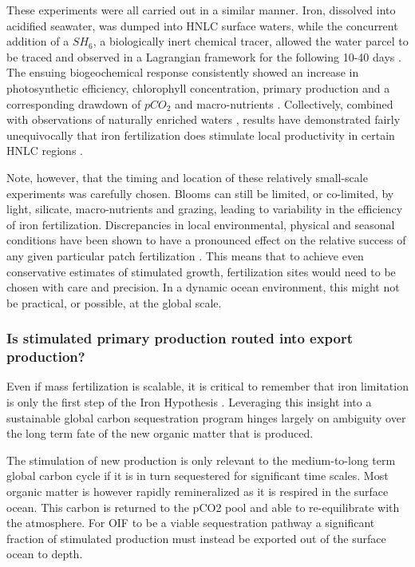 These experiments were all carried out in a similar manner. Iron, dissolved into acidified seawater, was dumped into HNLC surface waters, while the concurrent addition of a $SH_6$, a biologically inert chemical tracer, allowed the water parcel to be traced and observed in a Lagrangian framework for the following 10-40 days \parencite{BoydMesoscaleIronEnrichment2007}. The ensuing biogeochemical response consistently showed an increase in photosynthetic efficiency, chlorophyll concentration, primary production and a corresponding drawdown of $pCO_2$ and macro-nutrients \parencite{YoonOceanIronFertilization2016}. Collectively, combined with observations of naturally enriched waters \parencite{deBaarSynthesisironfertilization2005}, results have demonstrated fairly unequivocally that iron fertilization does stimulate local productivity in certain HNLC regions \parencite{YoonOceanIronFertilization2016, BoydMesoscaleIronEnrichment2007}. 

Note, however, that the timing and location of these relatively small-scale experiments was carefully chosen. Blooms can still be limited, or co-limited, by light, silicate, macro-nutrients and grazing, leading to variability in the efficiency of iron fertilization. Discrepancies in local environmental, physical and seasonal conditions have been shown to have a pronounced effect on the relative success of any given particular patch fertilization \parencite{BoydMesoscaleIronEnrichment2007}. This means that to achieve even conservative estimates of stimulated growth, fertilization sites would need to be chosen with care and precision. In a dynamic ocean environment, this might not be practical, or possible, at the global scale. 

\subsubsection{Is stimulated primary production routed into export production?}

Even if mass fertilization is scalable, it is critical to remember that iron limitation is only the first step of the Iron Hypothesis \parencite{BuesselerOceanIronFertilization2008}. Leveraging this insight into a sustainable global carbon sequestration program hinges largely on ambiguity over the long term fate of the new organic matter that is produced.

The stimulation of new production is only relevant to the medium-to-long term global carbon cycle if it is in turn sequestered for significant time scales. Most organic matter is however rapidly remineralized as it is respired in the surface ocean. This carbon is returned to the pCO2 pool and able to re-equilibrate with the atmosphere. For OIF to be a viable sequestration pathway a significant fraction of stimulated production must instead be exported out of the surface ocean to depth. 

